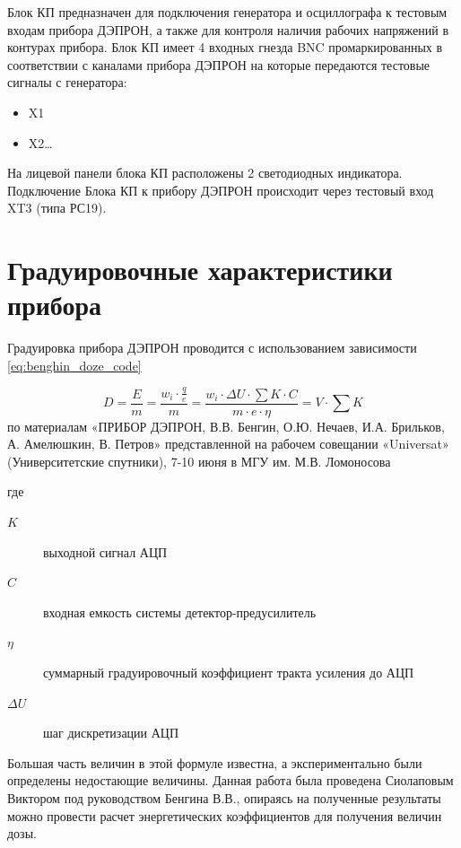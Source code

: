 

Блок КП предназначен для подключения генератора и осциллографа к тестовым входам прибора ДЭПРОН, а также для контроля наличия рабочих напряжений в контурах прибора. Блок КП имеет 4 входных гнезда BNC промаркированных в соответствии с каналами прибора ДЭПРОН на которые передаются тестовые сигналы с генератора: 



\begin{itemize}
	
	\item 	X1	
	
	\item 	X2\ldots
		
\end{itemize}

На лицевой панели блока КП расположены 2 светодиодных индикатора. Подключение Блока КП к прибору ДЭПРОН происходит через тестовый вход XT3 (типа РС19).


\section{Градуировочные  характеристики прибора}
Градуировка прибора ДЭПРОН проводится с использованием зависимости \ref{eq:benghin_doze_code}

\begin{equation}\label{eq:benghin_doze_code}
D = \frac{E}{m} = \dfrac{w_i \cdot\frac{q}{e}}{m} = \frac{w_i \cdot \Delta U \cdot\sum K \cdot C}{m \cdot e \cdot \eta}  = V \cdot \sum K
\end{equation}
по материалам  «ПРИБОР ДЭПРОН, В.В. Бенгин, О.Ю. Нечаев, И.А. Брильков, А. Амелюшкин, В. Петров»  представленной на рабочем совещании «Universat» (Университетские спутники), 7-10 июня в МГУ им. М.В. Ломоносова

где \begin{description}	
	\item[$ K $] выходной сигнал АЦП
	\item[$ C $] входная емкость системы детектор-предусилитель
	\item[$ \eta $] суммарный градуировочный коэффициент тракта усиления до АЦП
	\item[$ \Delta U $] шаг дискретизации АЦП
\end{description} 
Большая часть величин в этой формуле известна, а экспериментально были определены недостающие величины. Данная работа была проведена Сиолаповым Виктором под руководством Бенгина В.В., опираясь на полученные результаты можно провести расчет энергетических коэффициентов для получения величин дозы.

